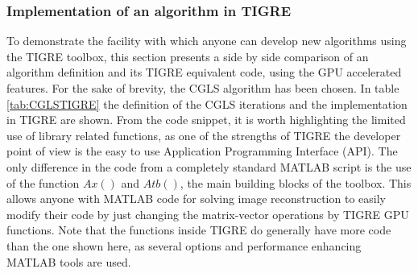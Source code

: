 \subsubsection{Implementation of an algorithm in TIGRE}
To demonstrate the facility with which anyone can develop new algorithms using the
TIGRE toolbox, this section presents a side by side comparison of an algorithm definition and its TIGRE equivalent code, using the GPU accelerated features. For the
sake of brevity, the CGLS algorithm has been chosen.
In table \ref{tab:CGLSTIGRE} the definition of the CGLS iterations and the implementation in TIGRE
are shown. From the code snippet, it is worth highlighting the limited use of library related
functions, as one of the strengths of TIGRE the developer point of view is the
easy to use Application Programming Interface (API). The only difference in the code
from a completely standard MATLAB script is the use of the function $Ax()$ and $Atb()$,
the main building blocks of the toolbox. This allows anyone
with MATLAB code for solving image reconstruction to easily modify their code by just
changing the matrix-vector operations by TIGRE GPU functions. Note that the functions inside TIGRE do generally have more code than the one shown here, as several options and performance enhancing MATLAB tools are used.



